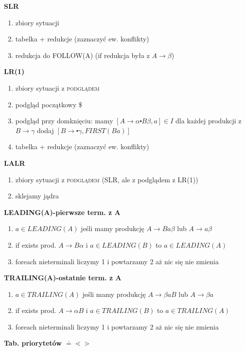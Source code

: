 \begin{multicols}{3}
\begin{enumerate}
    \end{enumerate}
    \textbf{SLR}
    \begin{enumerate}
      \item zbiory sytuacji
      \item tabelka + redukcje (zaznaczyć ew. konflikty)
      \item redukcja do FOLLOW(A) (if redukcja była z $A\rightarrow \beta$)
    \end{enumerate}
    \textbf{LR(1)}
    \begin{enumerate}
      \item zbiory sytuacji z \textsc{podglądem}
      \item podgląd początkowy \$
      \item podgląd przy domknięciu: mamy $[A\rightarrow \alpha \centerdot B \beta , a] \in I$ 
          dla każdej produkcji z $B\rightarrow \gamma$ dodaj 
          $[B\rightarrow \centerdot \gamma ,FIRST(Ba)]$
      \item tabelka + redukcje (zaznaczyć ew. konflikty)
    \end{enumerate}	
    \textbf{LALR}
    \begin{enumerate}
      \item zbiory sytuacji z \textsc{podglądem} (SLR, ale z podglądem z LR(1))
      \item sklejamy jądra
    \end{enumerate}	
    \textbf{LEADING(A)-pierwsze term. z A}
    \begin{enumerate}
      \item	$a \in LEADING(A)$ jeśli mamy produkcję $A\rightarrow Ba\beta$ lub $A \rightarrow a \beta$ 
      \item if exists prod. $A\rightarrow B\alpha$ i $a \in LEADING(B)$ to $a \in LEADING(A)$
      \item foreach nieterminali liczymy 1 i powtarzamy 2 aż nic się nie zmienia
    \end{enumerate}
    \textbf{TRAILING(A)-ostatnie term. z A}
    \begin{enumerate}
      \item	$a \in TRAILING(A)$ jeśli mamy produkcję $A\rightarrow \beta aB$ lub $A \rightarrow \beta a$ 
      \item if exists prod. $A\rightarrow \alpha B$ i $a \in TRAILING(B)$ to $a \in TRAILING(A)$
      \item foreach nieterminali liczymy 1 i powtarzamy 2 aż nic się nie zmienia
    \end{enumerate}
    \textbf{Tab. priorytetów $\doteq \lessdot \gtrdot $}

\end{multicols}
